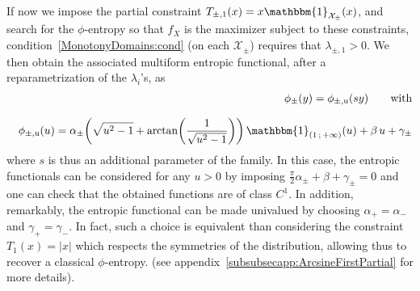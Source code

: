 \documentclass[entropy,article,submit,moreauthors,pdftex]{Definitions/mdpi}
\def\X{\mathcal{X}}%
\def\un{\mathbbm{1}}%
\def\u{\mathrm{u}}
\begin{document}
{\begin{Example}\label{arcsineMulti:ex}
  If now  we impose the  partial constraint $T_{\pm,1}(x) =  x \un_{\X_\pm}(x)$,
  and search  for the $\phi$-entropy so  that $f_X$ is the  maximizer subject to
  these  constraints,  condition~\ref{MonotonyDomains:cond} (on  each  $\X_\pm$)
  requires that $\lambda_{\pm,1} > 0$.   We then obtain the associated multiform
  entropic functional, after a reparametrization of the $\lambda_i$'s, as
  \begin{eqnarray*}
     &&\phi_\pm(y) = \phi_{\pm,\u}(s y)\qquad \mbox{with}
     \\[2.5mm]
    &&\phi_{\pm,\u}(u) = \alpha_\pm \left( \sqrt{u^2 - 1} +
  \arctan\left( \frac{1}{\sqrt{u^2 - 1}}  \right) \right) \,
  \un_{( 1  \, ;  \, +\infty  )}(u) +  \beta \,  u +
  \gamma_\pm
  \end{eqnarray*}
  where $s$ is  thus an additional parameter  of the family.  In  this case, the
  entropic  functionals  can  be  considered  for   any  $u  >  0$  by  imposing
  $\frac{\pi}{2} \alpha_\pm + \beta + \gamma_\pm = 0$ and one can check that the
  obtained functions are of class  $C^1$.  In addition, remarkably, the entropic
  functional  can  be made  univalued  by  choosing  $\alpha_+ =  \alpha_-$  and
  $\gamma_+ = \gamma_-$.  In fact, such  a choice is equivalent than considering
  the  constraint  $T_1(x)   =  |x|$  which  respects  the   symmetries  of  the
  distribution,  allowing  thus to  recover  a  classical $\phi$-entropy.   (see
  appendix~\ref{subsubsecapp:ArcsineFirstPartial} for more details).
\end{Example}

}
\end{document}
